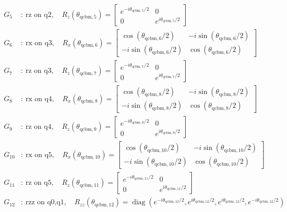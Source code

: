 \begin{align*}
G_{5}&:\ \text{rz on q2},\quad R_z(\theta_{\mathrm{qcbm},5})=\begin{bmatrix}e^{-i\theta_{\mathrm{qcbm},5}/2}&0\\0&e^{i\theta_{\mathrm{qcbm},5}/2}\end{bmatrix}\\
G_{6}&:\ \text{rx on q3},\quad R_x(\theta_{\mathrm{qcbm},6})=\begin{bmatrix}\cos(\theta_{\mathrm{qcbm},6}/2)&-i\sin(\theta_{\mathrm{qcbm},6}/2)\\-i\sin(\theta_{\mathrm{qcbm},6}/2)&\cos(\theta_{\mathrm{qcbm},6}/2)\end{bmatrix}\\
G_{7}&:\ \text{rz on q3},\quad R_z(\theta_{\mathrm{qcbm},7})=\begin{bmatrix}e^{-i\theta_{\mathrm{qcbm},7}/2}&0\\0&e^{i\theta_{\mathrm{qcbm},7}/2}\end{bmatrix}\\
G_{8}&:\ \text{rx on q4},\quad R_x(\theta_{\mathrm{qcbm},8})=\begin{bmatrix}\cos(\theta_{\mathrm{qcbm},8}/2)&-i\sin(\theta_{\mathrm{qcbm},8}/2)\\-i\sin(\theta_{\mathrm{qcbm},8}/2)&\cos(\theta_{\mathrm{qcbm},8}/2)\end{bmatrix}\\
G_{9}&:\ \text{rz on q4},\quad R_z(\theta_{\mathrm{qcbm},9})=\begin{bmatrix}e^{-i\theta_{\mathrm{qcbm},9}/2}&0\\0&e^{i\theta_{\mathrm{qcbm},9}/2}\end{bmatrix}\\
G_{10}&:\ \text{rx on q5},\quad R_x(\theta_{\mathrm{qcbm},10})=\begin{bmatrix}\cos(\theta_{\mathrm{qcbm},10}/2)&-i\sin(\theta_{\mathrm{qcbm},10}/2)\\-i\sin(\theta_{\mathrm{qcbm},10}/2)&\cos(\theta_{\mathrm{qcbm},10}/2)\end{bmatrix}\\
G_{11}&:\ \text{rz on q5},\quad R_z(\theta_{\mathrm{qcbm},11})=\begin{bmatrix}e^{-i\theta_{\mathrm{qcbm},11}/2}&0\\0&e^{i\theta_{\mathrm{qcbm},11}/2}\end{bmatrix}\\
G_{12}&:\ \text{rzz on q0,q1},\quad R_{zz}(\theta_{\mathrm{qcbm},12})=\operatorname{diag}(e^{-i\theta_{\mathrm{qcbm},12}/2},e^{i\theta_{\mathrm{qcbm},12}/2},e^{i\theta_{\mathrm{qcbm},12}/2},e^{-i\theta_{\mathrm{qcbm},12}/2})\\

\end{align*}
